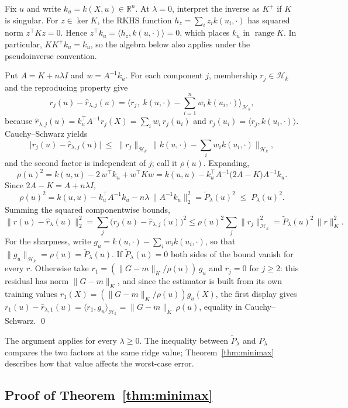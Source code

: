 Fix $u$ and write $k_u=k(X,u)\in\mathbb R^n$.
At $\lambda=0$, interpret the inverse as $K^+$ if $K$ is singular.
For $z\in\ker K$, the RKHS function $h_z=\sum_i z_i k(u_i,\cdot)$
has squared norm $z^\top Kz=0$. Hence
$z^\top k_u=\langle h_z,k(u,\cdot)\rangle=0$, which places $k_u$ in
$\operatorname{range}K$. In particular, $KK^+k_u=k_u$, so the algebra
below also applies under the pseudoinverse convention.

Put $A=K+n\lambda I$ and $w=A^{-1}k_u$.
For each component $j$, membership $r_j\in\mathcal H_k$ and
the reproducing property give
\[
r_j(u)-\widehat r_{\lambda,j}(u)
= \Big\langle r_j,\; k(u,\cdot)-\sum_{i=1}^n w_i\,k(u_i,\cdot)\Big\rangle_{\mathcal H_k},
\]
because $\widehat r_{\lambda,j}(u)=k_u^\top A^{-1}r_j(X)=\sum_i w_i\,r_j(u_i)$
and $r_j(u_i)=\langle r_j,k(u_i,\cdot)\rangle$. Cauchy--Schwarz yields
\[
\big|r_j(u)-\widehat r_{\lambda,j}(u)\big|\;\le\;\|r_j\|_{\mathcal H_k}\,
\Big\| k(u,\cdot)-\sum_i w_i k(u_i,\cdot)\Big\|_{\mathcal H_k},
\]
and the second factor is independent of $j$; call it $\rho(u)$. Expanding,
\[
\rho(u)^2 = k(u,u) - 2\,w^\top k_u + w^\top K w
= k(u,u) - k_u^\top A^{-1}\big(2A-K\big)A^{-1}k_u .
\]
Since $2A-K=A+n\lambda I$,
\[
\rho(u)^2 = k(u,u)-k_u^\top A^{-1}k_u - n\lambda\,\|A^{-1}k_u\|_2^2
=\widetilde P_\lambda(u)^2\;\le\;P_\lambda(u)^2 .
\]
Summing the squared componentwise bounds,
\[
\big\|r(u)-\widehat r_\lambda(u)\big\|_2^2=\sum_j\big(r_j(u)-\widehat
r_{\lambda,j}(u)\big)^2\le\rho(u)^2\sum_j\|r_j\|^2_{\mathcal H_k}
=\widetilde P_\lambda(u)^2\,\|r\|_K^2 .
\]
For the sharpness, write $g_u=k(u,\cdot)-\sum_iw_ik(u_i,\cdot)$, so that
$\|g_u\|_{\mathcal H_k}=\rho(u)=\widetilde P_\lambda(u)$. If
$\widetilde P_\lambda(u)=0$ both sides of the bound vanish for every $r$.
Otherwise take $r_1=(\|G-m\|_K/\rho(u))\,g_u$ and $r_j=0$ for $j\ge2$: this
residual has norm $\|G-m\|_K$, and since the estimator is built from its own
training values $r_1(X)=(\|G-m\|_K/\rho(u))g_u(X)$, the first display gives
$r_1(u)-\widehat r_{\lambda,1}(u)=\langle r_1,g_u\rangle_{\mathcal
H_k}=\|G-m\|_K\,\rho(u)$, equality in Cauchy--Schwarz. \qed

The argument applies for every $\lambda\ge0$. The inequality between
$\widetilde P_\lambda$ and $P_\lambda$ compares the two factors at the same
ridge value; Theorem~\ref{thm:minimax} describes how that value affects the
worst-case error.

\subsection{Proof of Theorem~\ref{thm:minimax}}
\label{proof:thm:minimax}

